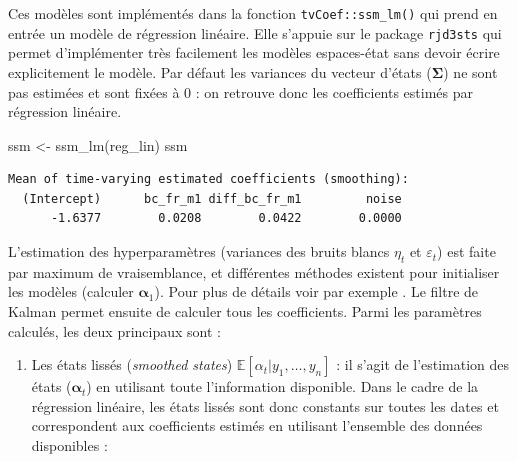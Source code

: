 \documentclass[
  a4paper,
  DIV=11,
  numbers=noendperiod,
  french]{scrartcl}
\newenvironment{Shaded}{\begin{snugshade}}{\end{snugshade}}
\newcommand{\AttributeTok}[1]{\textcolor[rgb]{0.40,0.45,0.13}{#1}}
\newcommand{\DecValTok}[1]{\textcolor[rgb]{0.68,0.00,0.00}{#1}}
\newcommand{\FunctionTok}[1]{\textcolor[rgb]{0.28,0.35,0.67}{#1}}
\newcommand{\NormalTok}[1]{\textcolor[rgb]{0.00,0.23,0.31}{#1}}
\newcommand{\OtherTok}[1]{\textcolor[rgb]{0.00,0.23,0.31}{#1}}
\newcommand{\SpecialCharTok}[1]{\textcolor[rgb]{0.37,0.37,0.37}{#1}}
\providecommand{\tightlist}{%
  \setlength{\itemsep}{0pt}\setlength{\parskip}{0pt}}\usepackage{longtable,booktabs,array}
\newcommand\1{{\mathds 1}}
\newcommand{\bf}[1]{{\boldsymbol #1}}
\newcommand{\E}[1]{\mathbb{E}\left[#1\right]}
\theoremstyle{remark}
\begin{document}
Ces modèles sont implémentés dans la fonction \texttt{tvCoef::ssm\_lm()}
qui prend en entrée un modèle de régression linéaire. Elle s'appuie sur
le package \texttt{rjd3sts} \autocite{rjd3sts} qui permet d'implémenter
très facilement les modèles espaces-état sans devoir écrire
explicitement le modèle. Par défaut les variances du vecteur d'états
(\(\bf \Sigma\)) ne sont pas estimées et sont fixées à 0 : on retrouve
donc les coefficients estimés par régression linéaire.

\begin{Shaded}
\begin{Highlighting}[]
\NormalTok{ssm }\OtherTok{\textless{}{-}} \FunctionTok{ssm\_lm}\NormalTok{(reg\_lin)}
\NormalTok{ssm}
\end{Highlighting}
\end{Shaded}

\begin{verbatim}
Mean of time-varying estimated coefficients (smoothing): 
  (Intercept)      bc_fr_m1 diff_bc_fr_m1         noise 
      -1.6377        0.0208        0.0422        0.0000 
\end{verbatim}

L'estimation des hyperparamètres (variances des bruits blancs \(\eta_t\)
et \(\varepsilon_t\)) est faite par maximum de vraisemblance, et
différentes méthodes existent pour initialiser les modèles (calculer
\(\bf \alpha_1\)). Pour plus de détails voir par exemple
\textcite{durbinkoopman}. Le filtre de Kalman permet ensuite de calculer
tous les coefficients. Parmi les paramètres calculés, les deux
principaux sont :

\begin{enumerate}
\def\labelenumi{\arabic{enumi}.}
\tightlist
\item
  Les états lissés (\emph{smoothed states})
  \(\E{\alpha_t|y_1,\dots,y_n}\) : il s'agit de l'estimation des états
  (\(\bf\alpha_t\)) en utilisant toute l'information disponible. Dans le
  cadre de la régression linéaire, les états lissés sont donc constants
  sur toutes les dates et correspondent aux coefficients estimés en
  utilisant l'ensemble des données disponibles :
\end{enumerate}

\begin{Shaded}
\end{Shaded}
\end{document}

